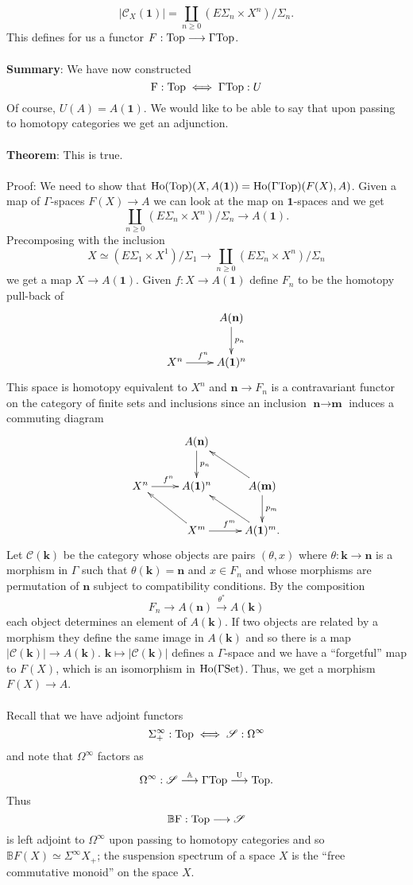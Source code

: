 \documentclass[11pt]{article}
\begin{document}
\begin{Jandr GammaCat notes}
\[|\mathscr{C}_X(\textbf{1})|=\coprod_{n\geq 0}(E\Sigma_n\times X^n)/\Sigma_n.\]
This defines for us a functor $F:\textup{Top}\to\Gamma\textup{Top}$.\\
\\
\textbf{Summary}: We have now constructed
\[\textup{F}:\textup{Top}\iff\Gamma\textup{Top}:U\]
Of course, $U(A)=A(\textbf{1})$. We would like to be able to say that upon passing to homotopy categories we get an adjunction.\\
\\
\textbf{Theorem}: This is true.\\
\\
Proof: We need to show that $\textup{Ho}(\textup{Top})(X,A(\textbf{1}))=\textup{Ho}(\Gamma\textup{Top})(F(X),A)$. Given a map of $\Gamma$-spaces $F(X)\to A$ we can look at the map on $\textbf{1}$-spaces and we get
\[\coprod_{n\geq 0}(E\Sigma_n\times X^n)/\Sigma_n\to A(\textbf{1}).\]
Precomposing with the inclusion
\[X\simeq(E\Sigma_1\times X^1)/\Sigma_1\to\coprod_{n\geq 0}(E\Sigma_n\times X^n)/\Sigma_n\]
we get a map $X\to A(\textbf{1})$. Given $f:X\to A(\textbf{1})$ define $F_n$ to be the homotopy pull-back of
\[\xymatrix{
& A(\textbf{n})\ar[d]^{p_n}\\
X^n\ar[r]^{f^n}& A(\textbf{1})^n
}\]
This space is homotopy equivalent to $X^n$ and $\textbf{n}\to F_n$ is a contravariant functor on the category of finite sets and inclusions since an inclusion $\textbf{n}\to\textbf{m}$ induces a commuting diagram
\[\xymatrix{
& A(\textbf{n})\ar[d]^{p_n}&\\
  X^n\ar[r]^{f^n}        & A(\textbf{1})^n & A(\textbf{m})\ar[d]^{p_m}\ar[lu]\\
& X^m\ar[r]^{f^m}\ar[lu] & A(\textbf{1})^m. \ar[lu] }\]
Let $\mathscr{C}(\textbf{k})$ be the category whose objects are pairs $(\theta,x)$ where $\theta:\textbf{k}\to\textbf{n}$ is a morphism in $\Gamma$ such that $\theta(\textbf{k})=\textbf{n}$ and $x\in F_n$ and whose morphisms are permutation of $\textbf{n}$ subject to compatibility conditions. By the composition
\[F_n\to A(\textbf{n})\overset{\theta^*}{\to}A(\textbf{k})\]
each object determines an element of $A(\textbf{k})$. If two objects are related by a morphism they define the same image in $A(\textbf{k})$ and so there is a map $|\mathscr{C}(\textbf{k})|\to A(\textbf{k})$. $\textbf{k}\mapsto|\mathscr{C}(\textbf{k})|$ defines a $\Gamma$-space and we have a ``forgetful'' map to $F(X)$, which is an isomorphism in $\textup{Ho}(\Gamma\textup{Set})$. Thus, we get a morphism $F(X)\to A$.\\
\\
Recall that we have adjoint functors
\[\Sigma^{\infty}_+:\textup{Top}\iff\mathscr{S}:\Omega^{\infty}\]
and note that $\Omega^{\infty}$ factors as
\[\Omega^{\infty}:\mathscr{S}\overset{\mathbb{A}}{\to}\Gamma\textup{Top}
\overset{\textup{U}}{\to}\textup{Top}.\]
Thus
\[\mathbb{B}\textup{F}:\textup{Top}\to\mathscr{S}\]
is left adjoint to $\Omega^{\infty}$ upon passing to homotopy categories and so $\mathbb{B}F(X)\simeq\Sigma^{\infty}X_+$; the suspension spectrum of a space $X$ is the ``free commutative monoid'' on the space $X$.


\end{Jandr GammaCat notes}
\end{document}
